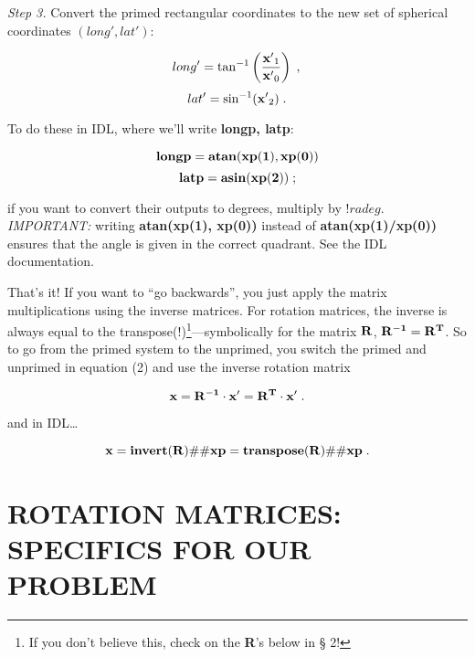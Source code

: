 \documentclass[11pt,preprint]{aastex}
\begin{document}
	{\it Step 3.} Convert the primed rectangular coordinates to the
new set of spherical coordinates $(long', lat')$:

\begin{mathletters} 
\begin{equation} 
long' = \tan^{-1} \left({{\bf x'}_1 \over {\bf x'}_0}\right) \; , \\ 
\end{equation} 
\begin{equation} 
lat' =
\sin^{-1} ({\bf x'}_2) \; .  
\end{equation} 
\end{mathletters}

\noindent To do these in IDL, where we'll write {\bf longp, latp}:

\begin{mathletters}
\begin{equation}
{\bf longp = atan(xp(1), xp(0))}
\end{equation}
\begin{equation}
{\bf latp = asin(xp(2))} \; ;
\end{equation}
\end{mathletters}

\noindent if you want to convert their outputs to degrees, multiply by
$!radeg$.  {\it IMPORTANT:} writing {\bf atan(xp(1), xp(0))} instead of
{\bf atan(xp(1)/xp(0))} ensures that the angle is given in the correct
quadrant.  See the IDL documentation. 

	That's it! If you want to ``go backwards'', you just apply the
matrix multiplications using the inverse matrices.  For rotation
matrices, the inverse is always equal to the transpose(!)\footnote{If
you don't believe this, check on the {\bf R}'s below in \S
2!}---symbolically for the matrix ${\bf R}$, ${\bf R^{-1}} = {\bf R^T}$. 
So to go from the primed system to the unprimed, you switch the primed
and unprimed in equation (2) and use the inverse rotation matrix

\begin{equation}
{\bf x} = {\bf R^{-1} \cdot x'} = {\bf R^T \cdot x'}\; .
\end{equation}

\noindent and in IDL\dots

\begin{equation} 
{\bf x} = {\bf invert(R) } \#\# {\bf xp} = {\bf transpose(R) } 
\#\# {\bf xp} \; .  
\end{equation}

\section {ROTATION MATRICES: SPECIFICS FOR OUR PROBLEM}
\end{document}
